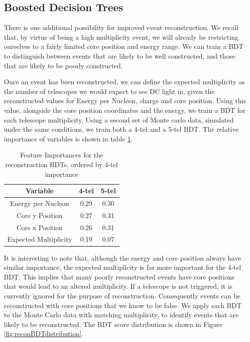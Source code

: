 \documentclass[11pt]{article}
\begin{document}
\subsection{Boosted Decision Trees}
There is one additional possibility for improved event reconstruction. We recall that, by virtue of being a high multiplicity event, we will already be restricting ourselves to a fairly limited core position and energy range. We can train a BDT to distinguish between events that are likely to be well constructed, and those that are likely to be poorly constructed. 

Once an event has been reconstructed, we can define the expected multiplicity as the number of telescopes we would expect to see DC light in, given the reconstructed values for Energy per Nucleon, charge and core position. Using this value, alongside the core position coordinates and the energy, we train a BDT for each telescope multiplicity. Using a second set of Monte carlo data, simulated under the same conditions, we train both a 4-tel and a 5-tel BDT. The relative importance of variables is shown in table \ref{tab:reconbdt}.

\begin{table}[h!]
  \centering
  \caption{Feature Importances for the reconstruction BDTs, ordered by 4-tel importance}
  \label{tab:reconbdt}
  \begin{tabular}{ccc}
    \toprule
    Variable & 4-tel & 5-tel\\
    \midrule
    Energy per Nucleon & 0.29 & 0.30\\
    Core y Position & 0.27 & 0.31\\
    Core x Position & 0.26 & 0.31\\ 
    Expected Multiplicity & 0.19 & 0.07\\
    \bottomrule
  \end{tabular}
\end{table}

It is interesting to note that, although the energy and core position always have similar importance, the expected multiplicity is far more important for the 4-tel BDT. This implies that many poorly reconstructed events have core positions that would lead to an altered multiplicity. If a telescope is not triggered, it is currently ignored for the purpose of reconstruction. Consequently events can be reconstructed with core positions that we know to be false. We apply each BDT to the Monte Carlo data with matching multiplicity, to identify events that are likely to be reconstructed. The BDT score distribution is shown in Figure \ref{fig:reconBDTdistribution}.
\end{document}
